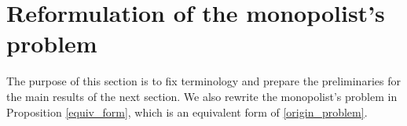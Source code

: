 





\bigskip



\section{Reformulation of the monopolist's problem}\label{section:preliminary}


The purpose of this section is to fix terminology and prepare the preliminaries for the main results of the next section. We also rewrite the monopolist's problem in Proposition \ref{equiv_form}, which is an equivalent form of \eqref{origin_problem}. \medskip


